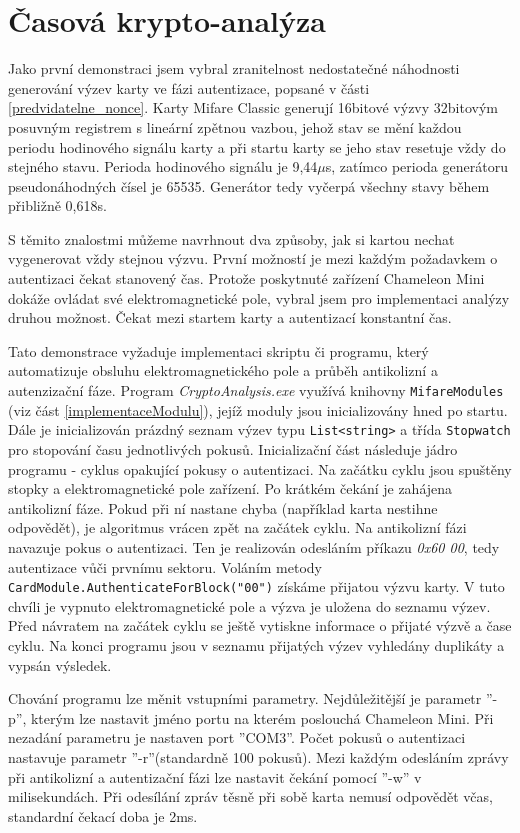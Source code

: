 \section{Časová krypto-analýza}
\label{casovaKryptoanalyza}
Jako první demonstraci jsem vybral zranitelnost nedostatečné náhodnosti generování výzev karty ve fázi autentizace, popsané v části \ref{predvidatelne_nonce}. Karty Mifare Classic generují 16bitové výzvy 32bitovým posuvným registrem s lineární zpětnou vazbou, jehož stav se mění každou periodu hodinového signálu karty a při startu karty se jeho stav resetuje vždy do stejného stavu. Perioda hodinového signálu je 9,44$\mu$s, zatímco perioda generátoru pseudonáhodných čísel je 65535. Generátor tedy vyčerpá všechny stavy během přibližně 0,618s. \par
S těmito znalostmi můžeme navrhnout dva způsoby, jak si kartou nechat vygenerovat vždy stejnou výzvu. První možností je mezi každým požadavkem o autentizaci čekat stanovený čas. Protože poskytnuté zařízení Chameleon Mini dokáže ovládat své elektromagnetické pole, vybral jsem pro implementaci analýzy druhou možnost. Čekat mezi startem karty a autentizací konstantní čas.\par
Tato demonstrace vyžaduje implementaci skriptu či programu, který automatizuje obsluhu elektromagnetického pole a průběh antikolizní a autenzizační fáze. Program \emph{CryptoAnalysis.exe} využívá knihovny \verb|MifareModules| (viz část \ref{implementaceModulu}), jejíž moduly jsou inicializovány hned po startu. Dále je inicializován prázdný seznam výzev typu \verb|List<string>| a třída \verb|Stopwatch| pro stopování času jednotlivých pokusů. Inicializační část následuje jádro programu - cyklus opakující pokusy o autentizaci. Na začátku cyklu jsou spuštěny stopky a elektromagnetické pole zařízení. Po krátkém čekání je zahájena antikolizní fáze. Pokud při ní nastane chyba (například karta nestihne odpovědět), je algoritmus vrácen zpět na začátek cyklu. Na antikolizní fázi navazuje pokus o autentizaci. Ten je realizován odesláním příkazu \emph{0x60 00}, tedy autentizace vůči prvnímu sektoru. Voláním metody \verb|CardModule.AuthenticateForBlock("00")| získáme přijatou výzvu karty. V tuto chvíli je vypnuto elektromagnetické pole a výzva je uložena do seznamu výzev. Před návratem na začátek cyklu se ještě vytiskne informace o přijaté výzvě a čase cyklu. Na konci programu jsou v seznamu přijatých výzev vyhledány duplikáty a vypsán výsledek. \par
Chování programu lze měnit vstupními parametry. Nejdůležitější je parametr ''-p'', kterým lze nastavit jméno portu na kterém poslouchá Chameleon Mini. Při nezadání parametru je nastaven port ''COM3''. Počet pokusů o autentizaci nastavuje parametr ''-r''(standardně 100 pokusů). Mezi každým odesláním zprávy při antikolizní a autentizační fázi lze nastavit čekání pomocí ''-w'' v milisekundách. Při odesílání zpráv těsně při sobě karta nemusí odpovědět včas, standardní čekací doba je 2ms. 


